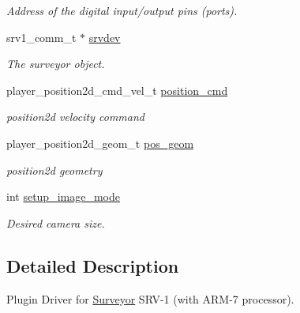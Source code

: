 \begin{CompactItemize}
\begin{CompactList}\small\item\em Address of the digital input/output pins (ports). \item\end{CompactList}\item 
\hypertarget{classSurveyor_2944f9704a7846b9607c5fc330f51a0a}{
srv1\_\-comm\_\-t $\ast$ \hyperlink{classSurveyor_2944f9704a7846b9607c5fc330f51a0a}{srvdev}}
\label{classSurveyor_2944f9704a7846b9607c5fc330f51a0a}

\begin{CompactList}\small\item\em The surveyor object. \item\end{CompactList}\item 
\hypertarget{classSurveyor_1633824b8c32a4dc48aecafb5f775956}{
player\_\-position2d\_\-cmd\_\-vel\_\-t \hyperlink{classSurveyor_1633824b8c32a4dc48aecafb5f775956}{position\_\-cmd}}
\label{classSurveyor_1633824b8c32a4dc48aecafb5f775956}

\begin{CompactList}\small\item\em position2d velocity command \item\end{CompactList}\item 
\hypertarget{classSurveyor_d59f0d50a970033851d0c6e6e72d48b7}{
player\_\-position2d\_\-geom\_\-t \hyperlink{classSurveyor_d59f0d50a970033851d0c6e6e72d48b7}{pos\_\-geom}}
\label{classSurveyor_d59f0d50a970033851d0c6e6e72d48b7}

\begin{CompactList}\small\item\em position2d geometry \item\end{CompactList}\item 
\hypertarget{classSurveyor_a9a8bda99bee792ea04267b650a4e161}{
int \hyperlink{classSurveyor_a9a8bda99bee792ea04267b650a4e161}{setup\_\-image\_\-mode}}
\label{classSurveyor_a9a8bda99bee792ea04267b650a4e161}

\begin{CompactList}\small\item\em Desired camera size. \item\end{CompactList}\end{CompactItemize}


\subsection{Detailed Description}
Plugin Driver for \hyperlink{classSurveyor}{Surveyor} SRV-1 (with ARM-7 processor). 

